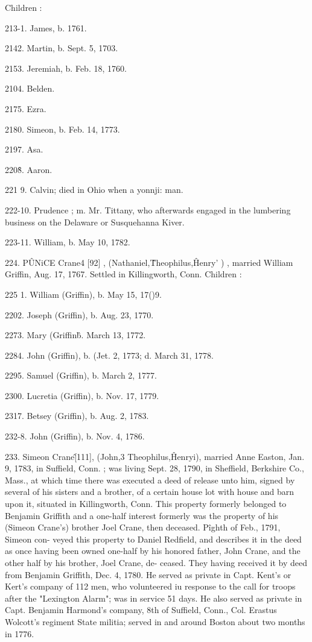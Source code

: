 Children : 

213-1. James, b. 1761. 

2142. Martin, b. Sept. 5, 1703. 

2153. Jeremiah, b. Feb. 18, 1760. 

2104. Belden. 

2175. Ezra. 

2180. Simeon, b. Feb. 14, 1773. 

2197. Asa. 

220\^8. Aaron. 

221  9. Calvin; died in Ohio when a yonnji: man. 

222-10. Prudence ; m. Mr. Tittany, who afterwards engaged in the 
lumbering business on the Delaware or Susquehanna Kiver. 

223-11. William, b. May 10, 1782. 

224. P\^UNiCE Crane4 [92] , (Nathaniel,\^ Theophilus,\^ Henry' ) , 
married William Griffin, Aug. 17, 1767. Settled in Killingworth, 
Conn. Children : 

225  1. William (Griffin), b. May 15, 17()9. 

2202. Joseph (Griffin), b. Aug. 23, 1770. 

2273. Mary (Griffin\^ b. March 13, 1772. 

2284. John (Griffin), b. (Jet. 2, 1773; d. March 31, 1778. 

2295. Samuel (Griffin), b. March 2, 1777. 

2300. Lucretia (Griffin), b. Nov. 17, 1779. 

2317. Betsey (Griffin), b. Aug. 2, 1783. 

232-8. John (Griffin), b. Nov. 4, 1786. 

233. Simeon Crane\^ [111], (John,3 Theophilus,\^ Henryi), 
married Anne Easton, Jan. 9, 1783, in Suffield, Conn. ; was 
living Sept. 28, 1790, in Sheffield, Berkshire Co., Mass., at 
which time there was executed a deed of release unto him, signed 
by several of his sisters and a brother, of a certain house lot with 
house and barn upon it, situated in Killingworth, Conn. This 
property formerly belonged to Benjamin Griffith and a one-half 
interest formerly was the property of his (Simeon Crane's) brother 
Joel Crane, then deceased. P\^ighth of Feb., 1791, Simeon con- 
veyed this property to Daniel Redfield, and describes it in the 
deed as once having been owned one-half by his honored father, 
John Crane, and the other half by his brother, Joel Crane, de- 
ceased. They having received it by deed from Benjamin Griffith, 
Dec. 4, 1780. He served as private in Capt. Kent's or Kert's 
company of 112 men, who volunteered iu response to the call for 
troops after the "Lexington Alarm"; was in service 51 days. 
He also served as private in Capt. Benjamin Harmond's company, 
8th of Suffield, Conn., Col. Erastus Wolcott's regiment State 
militia; served in and around Boston about two months in 1776. 




